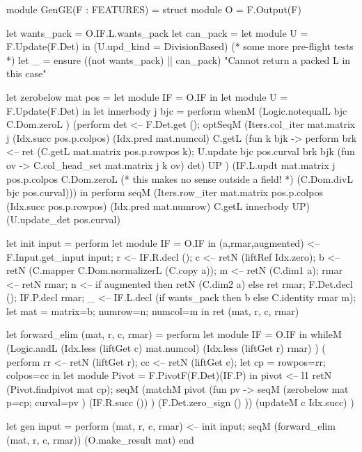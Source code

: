 \documentclass[draft]{elsart}
\begin{document}
\begin{code2}
module GenGE(F : FEATURES) = struct
    module O = F.Output(F)

    let wants_pack = O.IF.L.wants_pack
    let can_pack   = 
        let module U = F.Update(F.Det) in
        (U.upd_kind = DivisionBased)
    (* some more pre-flight tests *)
    let _ = ensure ((not wants_pack) || can_pack) 
           "Cannot return a packed L in this case"

    let zerobelow mat pos = 
        let module IF = O.IF in
        let module U = F.Update(F.Det) in
        let innerbody j bjc = perform
            whenM (Logic.notequalL bjc C.Dom.zeroL ) (perform
                det <-- F.Det.get ();
                optSeqM (Iters.col_iter mat.matrix j (Idx.succ pos.p.colpos) 
               (Idx.pred mat.numcol) C.getL
                      (fun k bjk -> perform
                      brk <-- ret (C.getL mat.matrix pos.p.rowpos k);
                      U.update bjc pos.curval brk bjk 
                          (fun ov -> C.col_head_set mat.matrix j k ov) det) UP )
                      (IF.L.updt mat.matrix j pos.p.colpos C.Dom.zeroL 
                          (* this makes no sense outside a field! *)
                          (C.Dom.divL bjc pos.curval))) in
        perform
              seqM (Iters.row_iter mat.matrix pos.p.colpos
              (Idx.succ pos.p.rowpos)
              (Idx.pred mat.numrow) C.getL innerbody UP) 
                   (U.update_det pos.curval)

   let init input = perform
        let module IF = O.IF in
          (a,rmar,augmented) <-- F.Input.get_input input;
          r <-- IF.R.decl ();
          c <-- retN (liftRef Idx.zero);
          b <-- retN (C.mapper C.Dom.normalizerL (C.copy a));
          m <-- retN (C.dim1 a);
          rmar <-- retN rmar;
          n <-- if augmented then retN (C.dim2 a) else ret rmar;
          F.Det.decl ();
          IF.P.decl rmar;
          _ <-- IF.L.decl (if wants_pack then b else C.identity rmar m);
          let mat = {matrix=b; numrow=n; numcol=m} in
          ret (mat, r, c, rmar)

   let forward_elim (mat, r, c, rmar) = perform
        let module IF = O.IF in
          whileM (Logic.andL (Idx.less (liftGet c) mat.numcol)
                              (Idx.less (liftGet r) rmar) )
             ( perform
             rr <-- retN (liftGet r);
             cc <-- retN (liftGet c);
             let cp  = {rowpos=rr; colpos=cc} in
             let module Pivot = F.PivotF(F.Det)(IF.P) in
             pivot <-- l1 retN (Pivot.findpivot mat cp);
             seqM (matchM pivot (fun pv -> 
                      seqM (zerobelow mat {p=cp; curval=pv} )
                           (IF.R.succ ()) )
                      (F.Det.zero_sign () ))
                  (updateM c Idx.succ) )

   let gen input = perform
          (mat, r, c, rmar) <-- init input;
          seqM 
            (forward_elim (mat, r, c, rmar))
            (O.make_result mat)
end
\end{code2}
\end{document}
